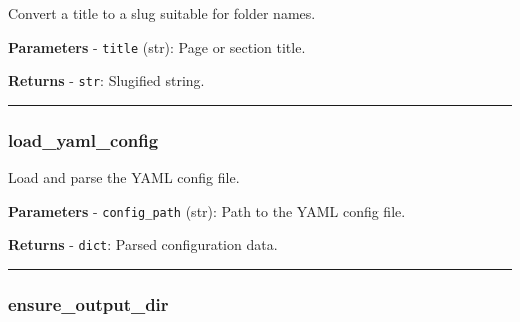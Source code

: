 \begin{Shaded}
\begin{Highlighting}[]
\NormalTok{) }\OperatorTok{{-}\textgreater{}} 
\end{Highlighting}
\end{Shaded}

Convert a title to a slug suitable for folder names.

\textbf{Parameters} - \texttt{title} (str): Page or section title.

\textbf{Returns} - \texttt{str}: Slugified string.

\begin{center}\rule{0.5\linewidth}{0.5pt}\end{center}

\subsubsection{load\_yaml\_config}\label{load_yaml_config}

\begin{Shaded}
\begin{Highlighting}[]
\NormalTok{) }\OperatorTok{{-}\textgreater{}} 
\end{Highlighting}
\end{Shaded}

Load and parse the YAML config file.

\textbf{Parameters} - \texttt{config\_path} (str): Path to the YAML
config file.

\textbf{Returns} - \texttt{dict}: Parsed configuration data.

\begin{center}\rule{0.5\linewidth}{0.5pt}\end{center}

\subsubsection{ensure\_output\_dir}\label{ensure_output_dir}

\begin{Shaded}
\begin{Highlighting}[]
\end{Highlighting}
\end{Shaded}

